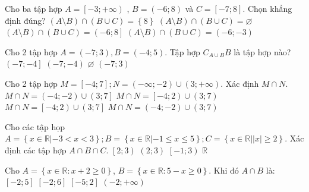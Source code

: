 \begin{ex}%
	Cho ba tập hợp $A=\left[-3;+\infty\right)$ , $B=\left(-6;8\right)$ và $C=\left[-7;8\right]$. Chọn khẳng định đúng?
	\choice
	{\True $\left(A\setminus B\right)\cap\left(B\cup C\right)=\left\{8\right\}$}
	{$\left(A\setminus B\right)\cap\left(B\cup C\right)=\varnothing $}
	{$\left(A\setminus B\right)\cap\left(B\cup C\right)=\left(-6;8\right]$}
	{$\left(A\setminus B\right)\cap\left(B\cup C\right)=\left(-6;-3\right)$}
	\loigiai{
		Ta có
		$A\setminus B=\left[8;+\infty\right) , B\cup C=\left[-7;8\right]$.
	}
\end{ex}

\begin{ex}%
	Cho 2 tập hợp $A=\left(-7;3\right),B=\left(-4;5\right)$. Tập hợp $C_{A\cup B}B$ là tập hợp nào?
	\choice
	{\True $\left(-7;-4\right]$}
	{$\left(-7;-4\right)$}
	{$\varnothing $}
	{$\left(-7;3\right)$}
	\loigiai{
		Ta có
		$A\cup B=\left(-7;5\right)$, khi đó $C_{A\cup B}B=\left(A\cup B\right)\setminus B=\left(-7;5\right)\setminus\left(-4;5\right)=\left(-7;-4\right]$.
	}
\end{ex}

\begin{ex}%
	Cho 2 tập hợp $M=\left[-4;7\right];N=\left(-\infty;-2\right)\cup\left(3;+\infty\right)$. Xác định $M\cap N$.
	\choice
	{$M\cap N=\left(-4;-2\right)\cup\left(3;7\right]$}
	{$M\cap N=\left[-4;2\right)\cup\left(3;7\right)$}
	{\True $M\cap N=\left[-4;2\right)\cup\left(3;7\right]$}
	{$M\cap N=\left(-4;-2\right)\cup\left(3;7\right)$}
\end{ex}

\begin{ex}%
	Cho các tập họp $A=\left\{ x\in\mathbb{R}|-3<x<3\right\};B=\left\{ x\in\mathbb{R}|-1\leq x\leq 5\right\};C=\left\{ x\in\mathbb{R}|\left| x\right|\geq 2\right\}$. Xác định các tập hợp $A\cap B\cap C$.
	\choice
	{\True $\left[2;3\right)$}
	{$\left(2;3\right)$}
	{$\left[-1;3\right)$}
	{$\mathbb{R}$}
	\loigiai{
		$A=\left(-3;3\right),B=\left[-1;5\right],C=\left(-\infty;-2\right]\cup\left[2;+\infty\right)
		\Rightarrow A\cap B=\left[-1;3\right)\Rightarrow A\cap B\cap C=\left[2;3\right)$.
	}
\end{ex}

\begin{ex}%
	Cho $A=\left\{x\in \mathbb{R}:x+2\geq 0\right\}$, $B=\left\{x\in \mathbb{R}:5-x\geq 0\right\}$. Khi đó $A\cap B$ là:
	\choice
	{\True $\left[-2;5\right]$}
	{$\left[-2;6\right]$}
	{$\left[-5;2\right]$}
	{$\left(-2;+\infty\right)$}
\end{ex}

